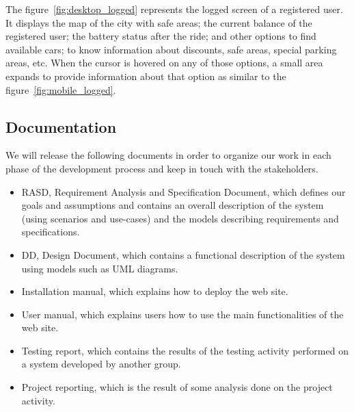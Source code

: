 The figure~\ref{fig:desktop_logged} represents the logged screen of a registered user. It displays the map of the city with safe areas; the current balance of the registered user; the battery status after the ride; and other options to find available cars; to know information about discounts, safe areas, special parking areas, etc. When the cursor is hovered on any of those options, a small area expands to provide information about that option as similar to the figure~\ref{fig:mobile_logged}.

\subsection{Documentation}
We will release the following documents in order to organize our work in each phase of the development process and keep in touch with the stakeholders.
\begin{itemize}
	\item RASD, Requirement Analysis and Specification Document, which defines our goals and assumptions and contains an overall description of the system (using scenarios and use-cases) and the models describing requirements and specifications.
	\item DD, Design Document, which contains a functional description of the system using models such as UML diagrams.
	\item Installation manual, which explains how to deploy the web site.
	\item User manual, which explains users how to use the main functionalities of the web site.
	\item Testing report, which contains the results of the testing activity performed on a system developed by another group.
	\item Project reporting, which is the result of some analysis done on the project activity.
\end{itemize}